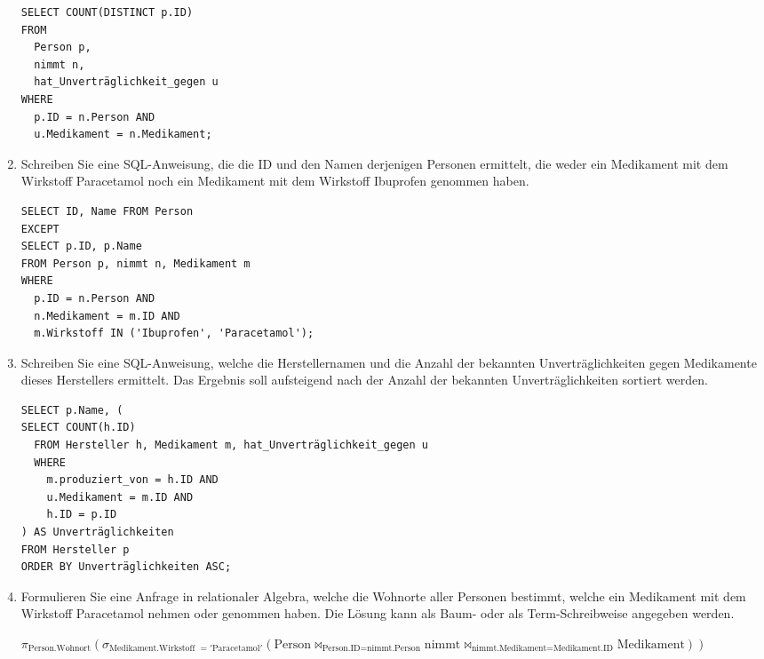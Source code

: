 \documentclass{lehramt-informatik-aufgabe}
\begin{document}
\begin{enumerate}
\begin{liAntwort}
\begin{verbatim}
SELECT COUNT(DISTINCT p.ID)
FROM
  Person p,
  nimmt n,
  hat_Unverträglichkeit_gegen u
WHERE
  p.ID = n.Person AND
  u.Medikament = n.Medikament;
\end{verbatim}
\end{liAntwort}

%

\item Schreiben Sie eine SQL-Anweisung, die die ID und den Namen
derjenigen Personen ermittelt, die weder ein Medikament mit dem
Wirkstoff Paracetamol noch ein Medikament mit dem Wirkstoff Ibuprofen
genommen haben.

\begin{liAntwort}
\begin{verbatim}
SELECT ID, Name FROM Person
EXCEPT
SELECT p.ID, p.Name
FROM Person p, nimmt n, Medikament m
WHERE
  p.ID = n.Person AND
  n.Medikament = m.ID AND
  m.Wirkstoff IN ('Ibuprofen', 'Paracetamol');
\end{verbatim}
\end{liAntwort}

%

\item Schreiben Sie eine SQL-Anweisung, welche die Herstellernamen und
die Anzahl der bekannten Unverträglichkeiten gegen Medikamente dieses
Herstellers ermittelt. Das Ergebnis soll aufsteigend nach der Anzahl der
bekannten Unverträglichkeiten sortiert werden.

\begin{liAntwort}
\begin{verbatim}
SELECT p.Name, (
SELECT COUNT(h.ID)
  FROM Hersteller h, Medikament m, hat_Unverträglichkeit_gegen u
  WHERE
    m.produziert_von = h.ID AND
    u.Medikament = m.ID AND
    h.ID = p.ID
) AS Unverträglichkeiten
FROM Hersteller p
ORDER BY Unverträglichkeiten ASC;
\end{verbatim}
\end{liAntwort}

%

\item Formulieren Sie eine Anfrage in relationaler Algebra, welche die
Wohnorte aller Personen bestimmt, welche ein Medikament mit dem
Wirkstoff Paracetamol nehmen oder genommen haben. Die Lösung kann als
Baum- oder als Term-Schreibweise angegeben werden.

\begin{liAntwort}
$\pi_{\text{Person.Wohnort}} \left(
  \sigma_{\text{Medikament.Wirkstoff }= '\text{Paracetamol}'}
  (
    \text{Person}
    \bowtie_{\text{Person.ID} = \text{nimmt.Person}}
    \text{nimmt}
    \bowtie_{\text{nimmt.Medikament} = \text{Medikament.ID}}
    \text{Medikament}
  )
\right)$
\end{liAntwort}


\end{enumerate}
\end{document}
